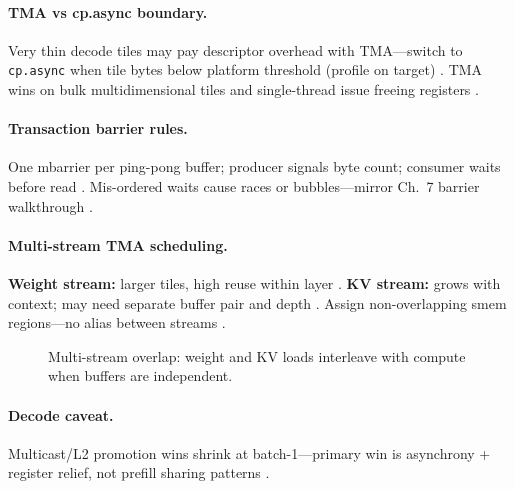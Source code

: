 \paragraph{TMA vs cp.async boundary.}
Very thin decode tiles may pay descriptor overhead with TMA---switch to \texttt{cp.async} when tile bytes below platform threshold (profile on target) \citep{dao2022flashattention,semianalysis2024tma,patel2025llminference}.
TMA wins on bulk multidimensional tiles and single-thread issue freeing registers \citep{shah2024flashattention3,nvidia2022hopper}.

\paragraph{Transaction barrier rules.}
One mbarrier per ping-pong buffer; producer signals byte count; consumer waits before read \citep{shah2024flashattention3,semianalysis2024tma}.
Mis-ordered waits cause races or bubbles---mirror Ch.~7 barrier walkthrough \citep{yirage2026,chen2020compilerbasedhardw}.

\paragraph{Multi-stream TMA scheduling.}
\textbf{Weight stream:} larger tiles, high reuse within layer \citep{taxbreak2026,kwon2023vllm}.
\textbf{KV stream:} grows with context; may need separate buffer pair and depth \citep{dao2023flashdecoding,shah2024flashattention3}.
Assign non-overlapping smem regions---no alias between streams \citep{yirage2026,dao2022flashattention}.

\begin{figure}[t]
\centering
{}
\caption{Multi-stream overlap: weight and KV loads interleave with compute when buffers are independent.}
\label{fig:ch08_multi_stream_timeline}
\end{figure}

\paragraph{Decode caveat.}
Multicast/L2 promotion wins shrink at batch-1---primary win is asynchrony + register relief, not prefill sharing patterns \citep{taxbreak2026,semianalysis2024tma,patel2025llminference}.

